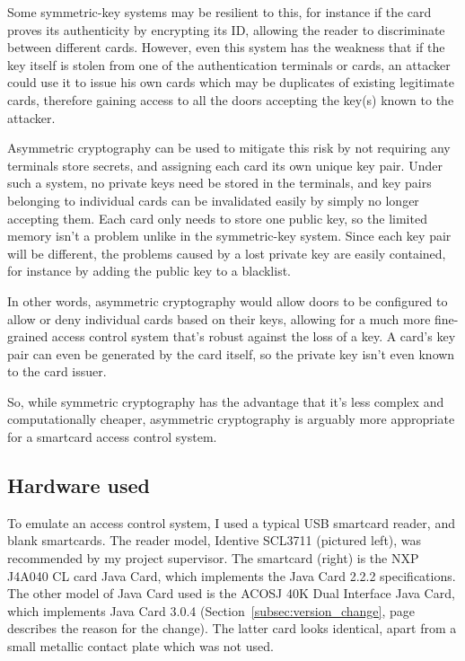 \documentclass[12pt]{article}
\begin{document}
Some symmetric-key systems may be resilient to this, for instance if the card proves its authenticity by encrypting its ID, allowing the reader to discriminate between different cards. However, even this system has the weakness that if the key itself is stolen from one of the authentication terminals or cards, an attacker could use it to issue his own cards which may be duplicates of existing legitimate cards, therefore gaining access to all the doors accepting the key(s) known to the attacker. 


Asymmetric cryptography can be used to mitigate this risk by not requiring any terminals store secrets, and assigning each card its own unique key pair. Under such a system, no private keys need be stored in the terminals, and key pairs belonging to individual cards can be invalidated easily by simply no longer accepting them. Each card only needs to store one public key, so the limited memory isn’t a problem unlike in the symmetric-key system. Since each key pair will be different, the problems caused by a lost private key are easily contained, for instance by adding the public key to a blacklist.

In other words, asymmetric cryptography would allow doors to be configured to allow or deny individual cards based on their keys, allowing for a much more fine-grained access control system that's robust against the loss of a key. A card’s key pair can even be generated by the card itself, so the private key isn’t even known to the card issuer.

So, while symmetric cryptography has the advantage that it’s less complex and computationally cheaper, asymmetric cryptography is arguably more appropriate for a smartcard access control system.



\subsection{Hardware used}
To emulate an access control system, I used a typical USB smartcard reader, and blank smartcards. The reader model, Identive SCL3711 (pictured left), was recommended by my project supervisor. The smartcard (right) is the NXP J4A040 CL card Java Card, which implements the Java Card 2.2.2 specifications. The other model of Java Card used is the ACOSJ 40K Dual Interface Java Card, which implements Java Card 3.0.4 (Section~\ref{subsec:version_change}, page~\pageref{subsec:version_change} describes the reason for the change). The latter card looks identical, apart from a small metallic contact plate which was not used.
\end{document}
